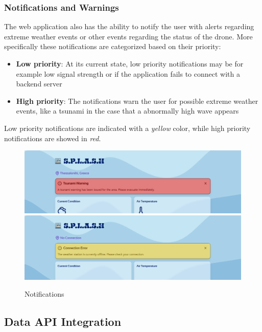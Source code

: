 \documentclass{article}
\begin{document}
    \subsubsection{Notifications and Warnings}
    The web application also has the ability to notify the user with alerts regarding extreme weather events or other events regarding the status of the drone.
    More specifically these notifications are categorized based on their priority:
    \begin{itemize}
        \item \textbf{Low priority}: At its current state, low priority notifications may be for example low signal strength or if the application fails to connect with a backend server
        \item \textbf{High priority}: The notifications warn the user for possible extreme weather events, like a tsunami in the case that a abnormally high wave appears
    \end{itemize}
    Low priority notifications are indicated with a \textit{yellow} color, while high priority notifications are showed in \textit{red}.
    
    \begin{figure}[h]
        \centering
        \includegraphics[width=0.75\linewidth]{assets/FE_F1.png}\\
        \vspace{1cm}
        \includegraphics[width=0.75\linewidth]{assets/FE_F4.png}
        \caption{Notifications}
        \label{fig:notifications}
    \end{figure}
    
\subsection{Data API Integration}
\end{document}
